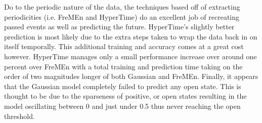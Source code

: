 Do to the periodic nature of the data, the techniques based off of extracting
periodicities (i.e. FreMEn and HyperTime) do an excellent job of recreating
passed events as well as predicting the future. HyperTime's slightly better
prediction is most likely due to the extra steps taken to wrap the data back
in on itself temporally.  This additional training and accuracy comes at a
great cost however. HyperTime manages only a small performance increase over
around one percent over FreMEn with a total training and prediction time
taking on the order of two magnitudes longer of both Gaussian and FreMEn.
Finally, it appears that the Gaussian model completely failed to predict any
open state.  This is thought to be due to the sparseness of positive, or open
states resulting in the model oscillating between 0 and just under 0.5 thus
never reaching the open threshold. \\

